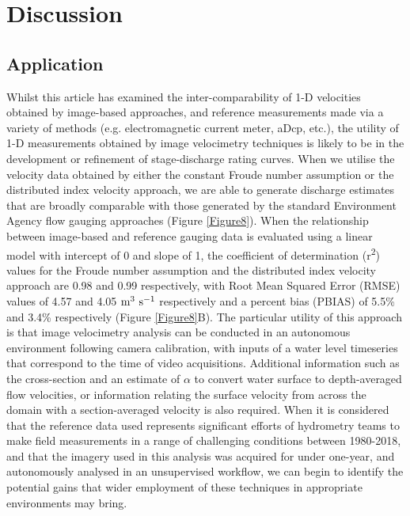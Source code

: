 \documentclass[hess, manuscript]{copernicus} %
\begin{document}
\section{Discussion}
\subsection{Application}
Whilst this article has examined the inter-comparability of 1-D velocities obtained by image-based approaches, and reference measurements made via a variety of methods (e.g. electromagnetic current meter, aDcp, etc.), the utility of 1-D measurements obtained by image velocimetry techniques is likely to be in the development or refinement of stage-discharge rating curves. When we utilise the velocity data obtained by either the constant Froude number assumption or the distributed index velocity approach, we are able to generate discharge estimates that are broadly comparable with those generated by the standard Environment Agency flow gauging approaches (Figure \ref{Figure8}). When the relationship between image-based and reference gauging data is evaluated using a linear model with intercept of 0 and slope of 1, the coefficient of determination (r\textsuperscript{2}) values for the Froude number assumption and the distributed index velocity approach are 0.98 and 0.99 respectively, with Root Mean Squared Error (RMSE) values of 4.57 and 4.05 $\textnormal{m\textsuperscript{3} s\textsuperscript{-1}}$ respectively and a percent bias (PBIAS) of 5.5\% and 3.4\% respectively (Figure \ref{Figure8}B). The particular utility of this approach is that image velocimetry analysis can be conducted in an autonomous environment following camera calibration, with inputs of a water level timeseries that correspond to the time of video acquisitions. Additional information such as the cross-section and an estimate of $\alpha$ to convert water surface to depth-averaged flow velocities, or information relating the surface velocity from across the domain with a section-averaged velocity is also required. When it is considered that the reference data used represents significant efforts of hydrometry teams to make field measurements in a range of challenging conditions between 1980-2018, and that the imagery used in this analysis was acquired for under one-year, and autonomously analysed in an unsupervised workflow, we can begin to identify the potential gains that wider employment of these techniques in appropriate environments may bring.
\end{document}
